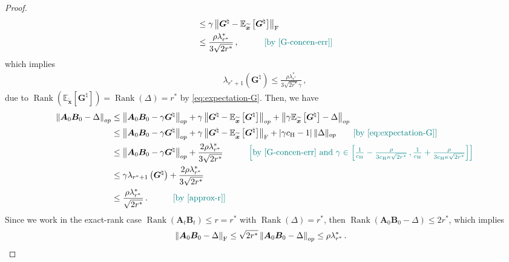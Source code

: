 \begin{proof}
\begin{align*}
    &\leq \gamma\left\|\bm G^\natural - \mathbb{E}_{\widetilde{\bm x}}\left[\bm G^\natural\right]\right\|_{\rm F} \\
    &\leq \frac{\rho\lambda^*_{r^*}}{3\sqrt{2r^*}}\,, \quad\tag*{\color{teal}[by \cref{G-concen-err}]}
\end{align*}
which implies
\begin{align}
    \lambda_{r^*+1}\left(\bm G^\natural\right) \leq \frac{\rho\lambda^*_{r^*}}{3\sqrt{2r^*}\gamma}\,,\label{approx-r}
\end{align}
due to $\operatorname{Rank}\left(\mathbb{E}_{\widetilde{\bm x}}\left[\bm G^\natural\right]\right)=\operatorname{Rank}(\Delta)=r^*$ by \cref{eq:expectation-G}. Then, we have
\begin{align}
    \left\|\bm A_0 \bm B_0 - \Delta\right\|_{op} & \leq \left\|\bm A_0 \bm B_0 - \gamma\bm G^\natural\right\|_{op} + \gamma\left\|\bm G^\natural - \mathbb{E}_{\widetilde{\bm x}}\left[\bm G^\natural\right]\right\|_{op} + \left\|\gamma\mathbb{E}_{\widetilde{\bm x}}\left[\bm G^\natural\right]-\Delta\right\|_{op}\nonumber\\
    & \leq \left\|\bm A_0 \bm B_0 - \gamma\bm G^\natural\right\|_{op} + \gamma \left\|\bm G^\natural - \mathbb{E}_{\widetilde{\bm x}}\left[\bm G^\natural\right]\right\|_{\rm F} + \left|\gamma c_{\rm H} - 1\right|\|\Delta\|_{op}\tag*{\color{teal}[by \cref{eq:expectation-G}]}\nonumber\\
    & \leq \left\|\bm A_0 \bm B_0 - \gamma\bm G^\natural\right\|_{op} + \frac{2\rho\lambda^*_{r^*}}{3\sqrt{2r^*}} \quad\tag*{\color{teal}$\left[\text{by \cref{G-concen-err} and }\gamma\in\left[\frac{1}{c_{\rm H}}-\frac{\rho}{3c_{\rm H}\kappa\sqrt{2r^*}}\,,\frac{1}{c_{\rm H}}+\frac{\rho}{3c_{\rm H}\kappa\sqrt{2r^*}}\right]\right]$}\nonumber\\
    & \leq \gamma\lambda_{r^*+1}\left(\bm G^\natural\right) + \frac{2\rho\lambda^*_{r^*}}{3\sqrt{2r^*}}\nonumber\\
    & \leq \frac{\rho\lambda^*_{r^*}}{\sqrt{2r^*}}\,.\quad \tag*{\color{teal}[by \cref{approx-r}]}
\end{align}
Since we work in the exact-rank case $\operatorname{Rank}\left(\bm A_t \bm B_t\right)\leq r=r^*$ with $\operatorname{Rank}(\Delta)=r^*$, then $\operatorname{Rank}(\bm A_0 \bm B_0 - \Delta)\leq 2r^*$, which implies
\begin{align*}
    \left\|\bm A_0 \bm B_0 - \Delta\right\|_{\rm F} & \leq \sqrt{2r^*} \left\|\bm A_0 \bm B_0 - \Delta\right\|_{op} \leq \rho\lambda^*_{r^*}\,.
\end{align*}
\end{proof}

